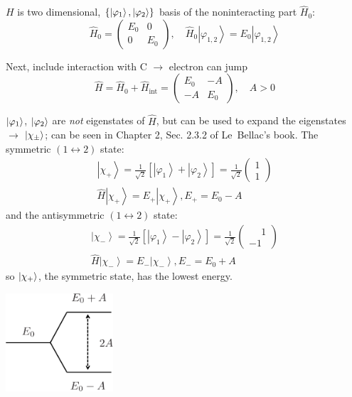 \documentclass[12pt]{article}
\newcommand{\be}{\begin{equation}}
\newcommand{\ee}{\end{equation}}
\begin{document}

$H$ is two dimensional, $\{\ket{\varphi_1},\ket{\varphi_2}\}$ basis of the
noninteracting part $\hat{H}_0$:
\be
\hat{H}_{0}=\left(\begin{array}{cc}E_{0} & 0 \\ 0 & E_{0}\end{array}\right), 
\quad 
\hat{H}_{0}\left|\varphi_{1,2}\right\rangle=E_{0}\left|\varphi_{1,2}\right\rangle
\ee

Next, include interaction with C $\to$ electron can jump
\be
\hat{H}=\hat{H}_{0}+\hat{H}_{\text {int}}=
\left(\begin{array}{cc}E_{0} & -A \\ -A & E_{0}\end{array}\right),\quad A>0
\ee

$\ket{\varphi_1}$, $\ket{\varphi_2}$ are \emph{not} eigenstates of $\hat{H}$, but can
be used to expand the eigenstates $\to$ $\ket{\chi_{\pm}}$; can be seen in Chapter 2, Sec. 2.3.2 of Le~Bellac's book.
The symmetric $(1\leftrightarrow2)$ state:
\be
\begin{array}{l}
\left|\chi_{+}\right\rangle=\frac{1}{\sqrt{2}}\left[\left|\varphi_{1}\right\rangle
+
\left|\varphi_{2}\right\rangle\right]=\frac{1}{\sqrt{2}}
\left(\begin{array}{l}1 \\ 1\end{array}\right) \\ 
\hat{H}\left|\chi_{+}\right\rangle=E_{+}\left|\chi_{+}\right\rangle, E_{+}=E_{0}-A
\end{array}
\ee
and
the antisymmetric $(1\leftrightarrow2)$ state:
\be
\begin{array}{l}
\left|\chi_{-}\right\rangle=\frac{1}{\sqrt{2}}\left[\left|\varphi_{1}\right\rangle
-
\left|\varphi_{2}\right\rangle\right]=\frac{1}{\sqrt{2}}
\left(\begin{array}{l}\phantom{-}1 \\ -1\end{array}\right) \\ 
\hat{H}\left|\chi_{-}\right\rangle=E_{-}\left|\chi_{-}\right\rangle, E_{-}=E_{0}+A
\end{array}
\ee
so $\ket{\chi_+}$, the symmetric state, has the lowest energy.

\begin{center}
\includegraphics[width=0.3\textwidth]{Figures/twoStates.pdf}
\end{center}
\end{document}
